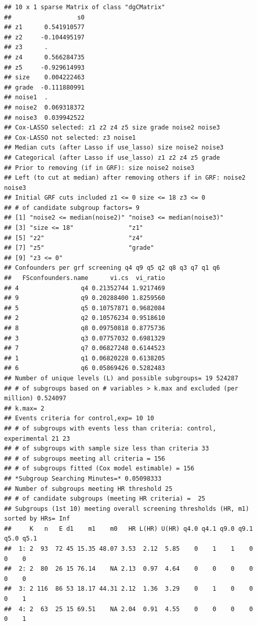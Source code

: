 \documentclass[smallextended]{svjour3}
\makeatletter
\newenvironment{kframe}{%
 \def\at@end@of@kframe{}%
 \ifinner\ifhmode%
  \def\at@end@of@kframe{\end{minipage}}%
  \begin{minipage}{\columnwidth}%
 \fi\fi%
 \def\FrameCommand##1{\hskip\@totalleftmargin \hskip-\fboxsep
 \colorbox{shadecolor}{##1}\hskip-\fboxsep
     \hskip-\linewidth \hskip-\@totalleftmargin \hskip\columnwidth}%
 \MakeFramed {\advance\hsize-\width
   \@totalleftmargin\z@ \linewidth\hsize
   \@setminipage}}%
 {\par\unskip\endMakeFramed%
 \at@end@of@kframe}
\newenvironment{knitrout}{}{} %
\makeatother
\begin{document}
\begin{knitrout}
\begin{kframe}
\begin{verbatim}
## 10 x 1 sparse Matrix of class "dgCMatrix"
##                  s0
## z1      0.541910577
## z2     -0.104495197
## z3      .          
## z4      0.566284735
## z5     -0.929614993
## size    0.004222463
## grade  -0.111880991
## noise1  .          
## noise2  0.069318372
## noise3  0.039942522
## Cox-LASSO selected: z1 z2 z4 z5 size grade noise2 noise3 
## Cox-LASSO not selected: z3 noise1 
## Median cuts (after Lasso if use_lasso) size noise2 noise3 
## Categorical (after Lasso if use_lasso) z1 z2 z4 z5 grade 
## Prior to removing (if in GRF): size noise2 noise3 
## Left (to cut at median) after removing others if in GRF: noise2 noise3 
## Initial GRF cuts included z1 <= 0 size <= 18 z3 <= 0 
## # of candidate subgroup factors= 9 
## [1] "noise2 <= median(noise2)" "noise3 <= median(noise3)"
## [3] "size <= 18"               "z1"                      
## [5] "z2"                       "z4"                      
## [7] "z5"                       "grade"                   
## [9] "z3 <= 0"                 
## Confounders per grf screening q4 q9 q5 q2 q8 q3 q7 q1 q6 
##   FSconfounders.name      vi.cs  vi_ratio
## 4                 q4 0.21352744 1.9217469
## 9                 q9 0.20288400 1.8259560
## 5                 q5 0.10757871 0.9682084
## 2                 q2 0.10576234 0.9518610
## 8                 q8 0.09750818 0.8775736
## 3                 q3 0.07757032 0.6981329
## 7                 q7 0.06827248 0.6144523
## 1                 q1 0.06820228 0.6138205
## 6                 q6 0.05869426 0.5282483
## Number of unique levels (L) and possible subgroups= 19 524287 
## # of subgroups based on # variables > k.max and excluded (per million) 0.524097 
## k.max= 2 
## Events criteria for control,exp= 10 10 
## # of subgroups with events less than criteria: control, experimental 21 23 
## # of subgroups with sample size less than criteria 33 
## # of subgroups meeting all criteria = 156 
## # of subgroups fitted (Cox model estimable) = 156 
## *Subgroup Searching Minutes=* 0.05098333 
## Number of subgroups meeting HR threshold 25 
## # of candidate subgroups (meeting HR criteria) =  25 
## Subgroups (1st 10) meeting overall screening thresholds (HR, m1) sorted by HRs= Inf 
##     K   n   E d1    m1    m0   HR L(HR) U(HR) q4.0 q4.1 q9.0 q9.1 q5.0 q5.1
##  1: 2  93  72 45 15.35 48.07 3.53  2.12  5.85    0    1    1    0    0    0
##  2: 2  80  26 15 76.14    NA 2.13  0.97  4.64    0    0    0    0    0    0
##  3: 2 116  86 53 18.17 44.31 2.12  1.36  3.29    0    1    0    0    0    1
##  4: 2  63  25 15 69.51    NA 2.04  0.91  4.55    0    0    0    0    0    1

\end{verbatim}
\end{kframe}
\end{knitrout}
\end{document}
